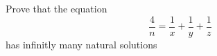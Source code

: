 Prove that the equation
\[\frac{4}{n}=\frac{1}{x}+\frac{1}{y}+\frac{1}{z}\]
has infinitly many natural solutions